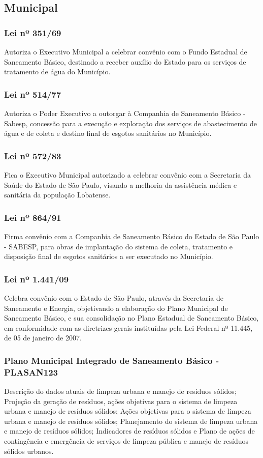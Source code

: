 \begin{subapend}
	\subsection{Municipal}
	\begin{subsubapend}
		\item \subsubsection{Lei nº 351/69}
		Autoriza o Executivo Municipal a celebrar convênio com o Fundo Estadual de Saneamento Básico, destinado a receber auxílio do Estado para os serviços de tratamento de água do Município.
		\subsubsection{Lei nº 514/77}
		Autoriza o Poder Executivo a outorgar à Companhia de Saneamento Básico - Sabesp, concessão para a execução e exploração dos serviços de abastecimento de água e de coleta e destino final de esgotos sanitários no Município.
		\subsubsection{Lei nº 572/83}
		Fica o Executivo Municipal autorizado a celebrar convênio com a Secretaria da Saúde do Estado de São Paulo, visando a melhoria da assistência médica e sanitária da população Lobatense.
		\subsubsection{Lei nº 864/91}
		Firma convênio com a Companhia de Saneamento Básico do Estado de São Paulo - SABESP, para obras de implantação do sistema de coleta, tratamento e disposição final de esgotos sanitários a ser executado no Município.
		\subsubsection{Lei nº 1.441/09}
		Celebra convênio com o Estado de São Paulo, através da Secretaria de Saneamento e Energia, objetivando a elaboração do Plano Municipal de Saneamento Básico, e sua consolidação no Plano Estadual de Saneamento Básico, em conformidade com as diretrizes gerais instituídas pela Lei Federal nº 11.445, de 05 de janeiro de 2007.
		\subsubsection{Plano Municipal Integrado de Saneamento Básico - PLASAN123}
		Descrição do dados atuais de limpeza urbana e manejo de resíduos sólidos; Projeção da geração de resíduos, ações objetivas para o sistema de limpeza urbana e manejo de resíduos sólidos; Ações objetivas para o sistema de limpeza urbana e manejo de resíduos sólidos; Planejamento do sistema de limpeza urbana e manejo de resíduos sólidos; Indicadores de resíduos sólidos e Plano de ações de contingência e emergência de serviços de limpeza pública e manejo de resíduos sólidos urbanos.

\end{subsubapend}
\end{subapend}

